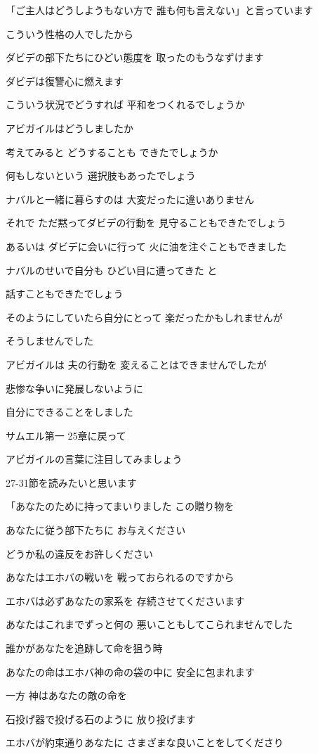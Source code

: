 \documentclass[twocolumn]{jsarticle}
\begin{document}
「ご主人はどうしようもない方で
誰も何も言えない」と言っています

こういう性格の人でしたから

ダビデの部下たちにひどい態度を
取ったのもうなずけます

ダビデは復讐心に燃えます

こういう状況でどうすれば
平和をつくれるでしょうか

アビガイルはどうしましたか

考えてみると どうすることも
できたでしょうか

何もしないという
選択肢もあったでしょう

ナバルと一緒に暮らすのは
大変だったに違いありません

それで ただ黙ってダビデの行動を
見守ることもできたでしょう

あるいは ダビデに会いに行って
火に油を注ぐこともできました

ナバルのせいで自分も
ひどい目に遭ってきた と

話すこともできたでしょう

そのようにしていたら自分にとって
楽だったかもしれませんが

そうしませんでした

アビガイルは 夫の行動を
変えることはできませんでしたが

悲惨な争いに発展しないように

自分にできることをしました

サムエル第一 25章に戻って

アビガイルの言葉に注目してみましょう

27-31節を読みたいと思います

「あなたのために持ってまいりました
この贈り物を

あなたに従う部下たちに
お与えください

どうか私の違反をお許しください

あなたはエホバの戦いを
戦っておられるのですから

エホバは必ずあなたの家系を
存続させてくださいます

あなたはこれまでずっと何の
悪いこともしてこられませんでした

誰かがあなたを追跡して命を狙う時

あなたの命はエホバ神の命の袋の中に
安全に包まれます

一方 神はあなたの敵の命を

石投げ器で投げる石のように
放り投げます

エホバが約束通りあなたに
さまざまな良いことをしてくださり
\end{document}
